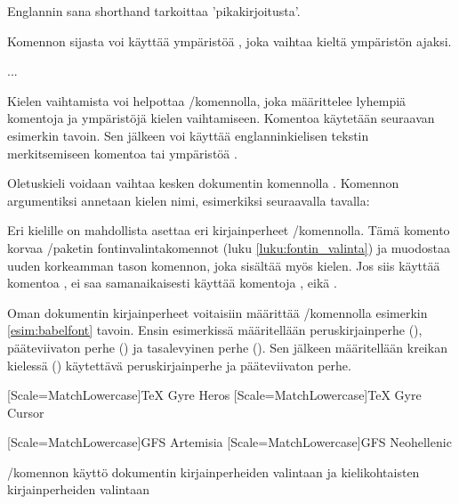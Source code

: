 \begin{koodilohkosis}
  Englannin sana \foreignlanguage{english}{shorthand} tarkoittaa
  'pikakirjoitusta'.
\end{koodilohkosis}

Komennon sijasta voi käyttää ympäristöä , joka
vaihtaa kieltä ympäristön ajaksi.

\begin{koodilohkosis}
  \begin{otherlanguage}{greek}
    ...
  \end{otherlanguage}
\end{koodilohkosis}

Kielen vaihtamista voi helpottaa \-/komennolla,
joka määrittelee lyhempiä komentoja ja ympäristöjä kielen vaihtamiseen.
Komentoa käytetään seuraavan esimerkin tavoin. Sen jälkeen voi käyttää
englanninkielisen tekstin merkitsemiseen komentoa  tai ympäristöä .

\begin{koodilohkosis}
\end{koodilohkosis}

Oletuskieli voidaan vaihtaa kesken dokumentin komennolla . Komennon argumentiksi annetaan kielen nimi,
esimerkiksi seuraavalla tavalla:

\begin{koodilohkosis}
\end{koodilohkosis}

Eri kielille on mahdollista asettaa eri kirjainperheet \-/komennolla. Tämä komento korvaa
\-/paketin fontinvalintakomennot (luku
\ref{luku:fontin_valinta}) ja muodostaa uuden korkeamman tason komennon,
joka sisältää myös kielen. Jos siis käyttää komentoa , ei saa samanaikaisesti käyttää komentoja ,  eikä .

Oman dokumentin kirjainperheet voitaisiin määrittää \-/komennolla esimerkin \ref{esim:babelfont} tavoin. Ensin
esimerkissä määritellään peruskirjainperhe (), pääteviivaton
perhe () ja tasalevyinen perhe (). Sen jälkeen
määritellään kreikan kielessä () käytettävä
peruskirjainperhe ja pääteviivaton perhe.

\begin{esimerkki*}
\begin{koodilohko}
  [Scale=MatchLowercase]{TeX Gyre Heros}
  [Scale=MatchLowercase]{TeX Gyre Cursor}

  [Scale=MatchLowercase]{GFS Artemisia}
  [Scale=MatchLowercase]{GFS Neohellenic}
\end{koodilohko}
\caption{\-/komennon käyttö dokumentin
  kirjainperheiden valintaan ja kielikohtaisten kirjainperheiden
  valintaan}
\label{esim:babelfont}
\end{esimerkki*}

